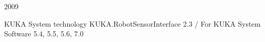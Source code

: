 \begin{thebibliography}{99}



    2009
    
    \newblock KUKA System technology
    KUKA.RobotSensorInterface 2.3 / For KUKA System Software 5.4, 5.5, 5.6, 7.0    
    
    
    
    
    
    
    
    
    
    
    \end{thebibliography}
    